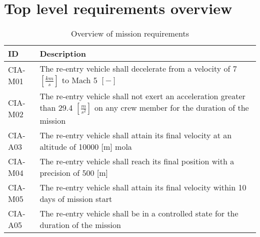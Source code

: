 \section{Top level requirements overview} \label{app:req}

\begin{table}[H]
	\caption{Overview of mission requirements} 
	\begin{tabular}{|p{}|p{}|}
    \hline
    ID          & Description                                                                                                      \\ \hline \hline
    CIA-M01& The re-entry vehicle shall decelerate from a velocity of 7 $[\frac{km}{s}]$ to Mach 5 $[-]$  \\ \hline
    CIA-M02 & The re-entry vehicle shall not exert an acceleration greater than 29.4 $[\frac{m}{s^2}]$ on any crew member for the duration of the mission			\\ \hline
    	CIA-A03 & The re-entry vehicle shall attain its final velocity at an altitude of 10000 [m] \gls{mola} \\ \hline
    	CIA-M04 & The re-entry vehicle shall reach its final position with a precision of 500 [m]\\ \hline
    	CIA-M05 & The re-entry vehicle shall attain its final velocity within 10 days of mission start \\ \hline
    CIA-A05 & The re-entry vehicle shall be in a controlled state for the duration of the mission                            \\ \hline

    \end{tabular}
\end{table}

